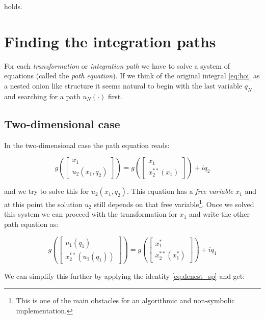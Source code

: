 \documentclass[a4paper,10pt]{article}
\begin{document}
holds.


\section{Finding the integration paths}

For each \emph{transformation} or \emph{integration path} we have to solve
a system of equations (called the \emph{path equation}). If we think of the
original integral \eqref{eq:hoi} as a nested onion like structure it seems
natural to begin with the last variable $q_N$ and searching for a path $u_N(\cdot)$
first.


\subsection{Two-dimensional case}

In the two-dimensional case the path equation reads:

\begin{equation} \label{eq:pequ2}
 g\left(
 \begin{bmatrix}
  x_1 \\ u_2(x_1, q_2)
 \end{bmatrix}
 \right)
 =
 g\left(
 \begin{bmatrix}
  x_1 \\ x_2^{**}(x_1)
 \end{bmatrix}
 \right)
 + i q_2
\end{equation}

and we try to solve this for $u_2(x_1, q_2)$. This equation has a \emph{free variable} $x_1$
and at this point the solution $u_2$ still depends on that free variable\footnote{This is
one of the main obstacles for an algorithmic and non-symbolic implementation.}.
Once we solved this system we can proceed with the transformation for $x_1$ and
write the other path equation as:

\begin{equation}
 g\left(
 \begin{bmatrix}
  u_1(q_1) \\
  x_2^{**}\left( u_1(q_1) \right)
 \end{bmatrix}
 \right)
 =
 g\left(
 \begin{bmatrix}
  x_1^{*} \\ x_2^{**}(x_1^{*})
 \end{bmatrix}
 \right)
 + i q_1
\end{equation}

We can simplify this further by applying the identity \eqref{eq:denest_sp} and get:
\end{document}

